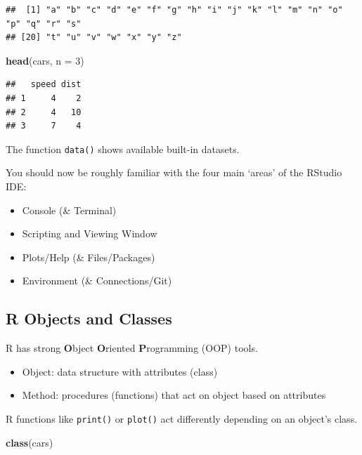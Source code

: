 \documentclass[
]{book}
\newenvironment{Shaded}{\begin{snugshade}}{\end{snugshade}}
\newcommand{\DataTypeTok}[1]{\textcolor[rgb]{0.13,0.29,0.53}{#1}}
\newcommand{\DecValTok}[1]{\textcolor[rgb]{0.00,0.00,0.81}{#1}}
\newcommand{\KeywordTok}[1]{\textcolor[rgb]{0.13,0.29,0.53}{\textbf{#1}}}
\newcommand{\NormalTok}[1]{#1}
\theoremstyle{definition}
\theoremstyle{definition}
\theoremstyle{definition}
\theoremstyle{remark}
\begin{document}
\begin{verbatim}
##  [1] "a" "b" "c" "d" "e" "f" "g" "h" "i" "j" "k" "l" "m" "n" "o" "p" "q" "r" "s"
## [20] "t" "u" "v" "w" "x" "y" "z"
\end{verbatim}

\begin{Shaded}
\begin{Highlighting}[]
\KeywordTok{head}\NormalTok{(cars, }\DataTypeTok{n =} \DecValTok{3}\NormalTok{)}
\end{Highlighting}
\end{Shaded}

\begin{verbatim}
##   speed dist
## 1     4    2
## 2     4   10
## 3     7    4
\end{verbatim}

The function \texttt{data()} shows available built-in datasets.

You should now be roughly familiar with the four main `areas' of the RStudio IDE:

\begin{itemize}
\item
  Console (\& Terminal)
\item
  Scripting and Viewing Window
\item
  Plots/Help (\& Files/Packages)
\item
  Environment (\& Connections/Git)
\end{itemize}

\hypertarget{r-objects-and-classes}{%
\subsection{R Objects and Classes}\label{r-objects-and-classes}}

R has strong \textbf{O}bject \textbf{O}riented \textbf{P}rogramming (OOP) tools.

\begin{itemize}
\item
  Object: data structure with attributes (class)
\item
  Method: procedures (functions) that act on object based on attributes
\end{itemize}

R functions like \texttt{print()} or \texttt{plot()} act differently depending on an object's class.

\begin{Shaded}
\begin{Highlighting}[]
\KeywordTok{class}\NormalTok{(cars)}
\end{Highlighting}
\end{Shaded}
\end{document}
